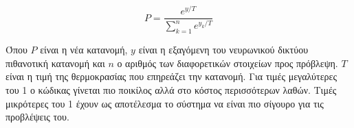 \begin{equation}
P = \frac{e^{y/T}}{\sum_{k = 1}^{n} e^{y_k/T}}
\end{equation}

Όπου $P$ είναι η νέα κατανομή, $y$ είναι η εξαγόμενη του νευρωνικού δικτύου πιθανοτική κατανομή και $n$ ο αριθμός των διαφορετικών στοιχείων προς πρόβλεψη. $T$ είναι η τιμή της θερμοκρασίας που επηρεάζει την  κατανομή.
Για τιμές μεγαλύτερες του 1 ο κώδικας γίνεται πιο ποικίλος αλλά στο κόστος περισσότερων λαθών.
Τιμές μικρότερες του 1 έχουν ως αποτέλεσμα το σύστημα να είναι πιο σίγουρο για τις προβλέψεις του.



